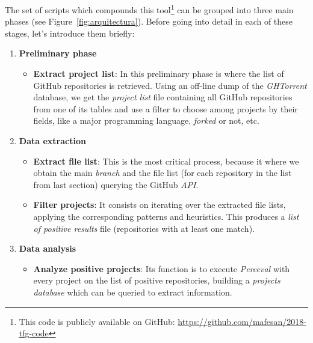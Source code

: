 \documentclass[a4paper, 12pt]{book}
\begin{document}
The set of scripts which compounds this tool\footnote{This code is publicly available on GitHub: \url{https://github.com/mafesan/2018-tfg-code}}
can be grouped into three main phases (see Figure~\ref{fig:arquitectura}).
Before going into detail in each of these stages, let's introduce them briefly:

\begin{enumerate}
  \item \textbf{Preliminary phase}
    \begin{itemize}
      \item \textbf{Extract project list}:
            In this preliminary phase is where the list of GitHub repositories is retrieved. Using an off-line dump of
            the \emph{GHTorrent} database, we get the \emph{project list} file containing all GitHub repositories from one of its tables
            and use a filter to choose among projects by their fields, like a major programming language, \textit{forked} or not, etc.
    \end{itemize}
  \item \textbf{Data extraction}
    \begin{itemize}
      \item \textbf{Extract file list}:
            This is the most critical process, because it where we obtain the main \textit{branch} and the file list
            (for each repository in the list from last section) querying the GitHub \textit{API}.
      \item \textbf{Filter projects}:
            It consists on iterating over the extracted file lists, applying the corresponding patterns and heuristics.
            This produces a \emph{list of positive results} file (repositories with at least one match).
    \end{itemize}
  \item \textbf{Data analysis}
    \begin{itemize}
      \item \textbf{Analyze positive projects}:
            Its function is to execute \emph{Perceval} with every project on the list of positive repositories,
            building a \emph{projects database} which can be queried to extract information.
    \end{itemize}
\end{enumerate}
\end{document}
